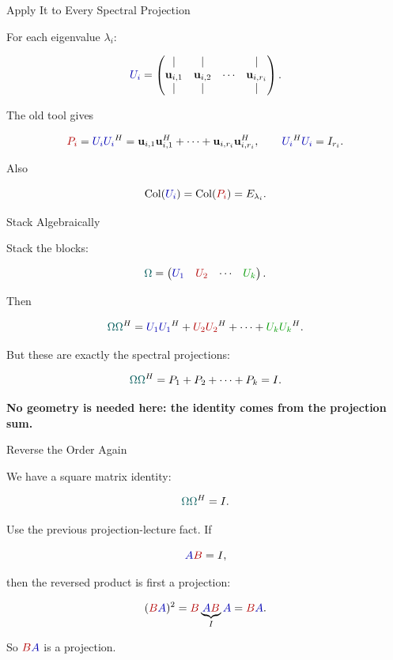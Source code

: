 \documentclass[10pt]{beamer}
\theoremstyle{definition}
\newcommand{\x}[1]{\alert{\textbf{#1}}}
\newcommand{\rd}[1]{{\color{red!70!black}#1}}
\newcommand{\bl}[1]{{\color{blue!70!black}#1}}
\newcommand{\gn}[1]{{\color{green!60!black}#1}}
\newcommand{\tl}[1]{{\color{teal!70!black}#1}}
\begin{document}
\begin{frame}{Apply It to Every Spectral Projection}

For each eigenvalue $\lambda_i$:

$$
\bl{U_i}=
\begin{pmatrix}
|&|& &|\\
\mathbf{u}_{i,1}&\mathbf{u}_{i,2}&\cdots&\mathbf{u}_{i,r_i}\\
|&|& &|
\end{pmatrix}.
$$

\vfill

The old tool gives

$$
\rd{P_i}
=\bl{U_i}\bl{U_i}^H
=\mathbf{u}_{i,1}\mathbf{u}_{i,1}^H+\cdots+\mathbf{u}_{i,r_i}\mathbf{u}_{i,r_i}^H,
\qquad
\bl{U_i}^H\bl{U_i}=I_{r_i}.
$$

\vfill\pause

Also

$$
\operatorname{Col}(\bl{U_i})
=\operatorname{Col}(\rd{P_i})
=E_{\lambda_i}.
$$

\end{frame}


\begin{frame}[shrink=7]{Stack Algebraically}

Stack the blocks:

$$
\tl{\Omega}=
\begin{pmatrix}
\bl{U_1}&\rd{U_2}&\cdots&\gn{U_k}
\end{pmatrix}.
$$

\vfill

Then

$$
\tl{\Omega}\tl{\Omega}^H
=
\bl{U_1}\bl{U_1}^H
+\rd{U_2}\rd{U_2}^H
+\cdots+
\gn{U_k}\gn{U_k}^H.
$$

\vfill\pause

But these are exactly the spectral projections:

$$
\tl{\Omega}\tl{\Omega}^H
=
P_1+P_2+\cdots+P_k
=I.
$$

\vfill

\x{No geometry is needed here: the identity comes from the projection sum.}

\end{frame}


\begin{frame}[shrink=6]{Reverse the Order Again}

We have a square matrix identity:

$$
\tl{\Omega}\tl{\Omega}^H=I.
$$

\vfill\pause

Use the previous projection-lecture fact.  If

$$
\bl{A}\rd{B}=I,
$$

then the reversed product is first a projection:

$$
(\rd{B}\bl{A})^2
=\rd{B}\underbrace{\bl{A}\rd{B}}_{I}\bl{A}
=\rd{B}\bl{A}.
$$

\vfill

So $\rd{B}\bl{A}$ is a projection.

\end{frame}
\end{document}
